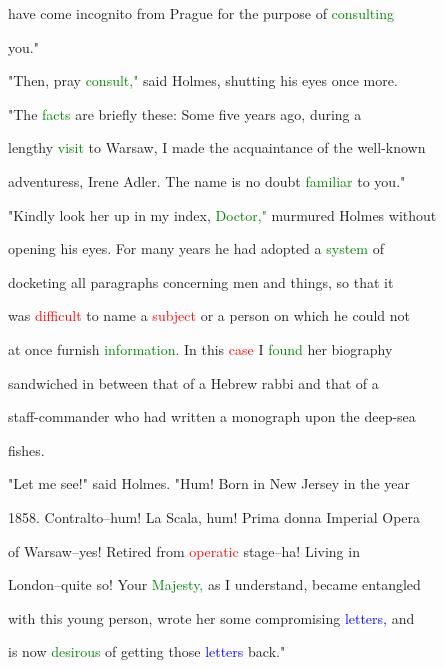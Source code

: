  have come incognito from Prague for the purpose of \textcolor{green}{consulting}

 you."



 "Then, \textcolor{BurntOrange}{pray} \textcolor{green}{consult,"} said Holmes, shutting his eyes once more.



 "The \textcolor{green}{facts} are briefly these: Some five years ago, during a

 lengthy \textcolor{green}{visit} to Warsaw, I made the acquaintance of the well-known

 adventuress, Irene Adler. The name is no \textcolor{BurntOrange}{doubt} \textcolor{green}{familiar} to you."



 "Kindly look her up in my index, \textcolor{green}{Doctor,"} murmured Holmes without

 opening his eyes. For many years he had adopted a \textcolor{green}{system} of

 docketing all paragraphs concerning men and things, so that it

 was \textcolor{red}{difficult} to name a \textcolor{red}{subject} or a person on which he could not

 at once furnish \textcolor{green}{information.} In this \textcolor{red}{case} I \textcolor{green}{found} her biography

 sandwiched in between that of a Hebrew rabbi and that of a

 staff-commander who had written a monograph upon the deep-sea

 fishes.



 "Let me see!" said Holmes. "Hum! Born in New Jersey in the year

 1858. Contralto--hum! La Scala, hum! Prima donna Imperial \textcolor{BurntOrange}{Opera}

 of Warsaw--yes! Retired from \textcolor{red}{operatic} stage--ha! Living in

 London--quite so! Your \textcolor{green}{Majesty,} as I understand, became entangled

 with this \textcolor{BurntOrange}{young} person, wrote her some compromising \textcolor{blue}{letters,} and

 is now \textcolor{green}{desirous} of getting those \textcolor{blue}{letters} back."



